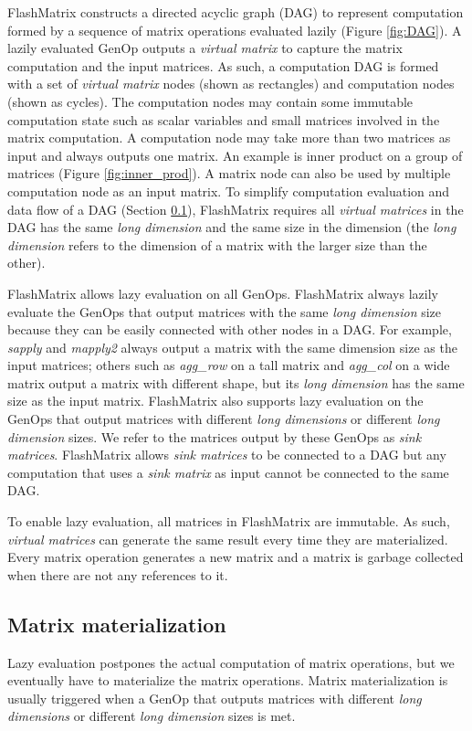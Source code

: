 FlashMatrix constructs a directed acyclic graph (DAG) \cite{} to represent
computation formed by a sequence of matrix operations evaluated lazily
(Figure \ref{fig:DAG}). A lazily evaluated GenOp outputs a \textit{virtual matrix}
to capture the matrix computation and the input matrices. As such, a computation
DAG is formed with a set of \textit{virtual matrix} nodes (shown as rectangles)
and computation nodes (shown as cycles).
The computation nodes may contain some immutable computation state such as
scalar variables and small matrices involved in the matrix computation.
A computation node may take more than two matrices as input and always outputs
one matrix. An example is inner product on a group of matrices (Figure
\ref{fig:inner_prod}). A matrix node can also be used by multiple computation
node as an input matrix.
To simplify computation evaluation and data flow of a DAG (Section
\ref{sec:materialize}), FlashMatrix requires all \textit{virtual matrices} in
the DAG has the same \textit{long dimension} and the same size in the dimension
(the \textit{long dimension} refers to the dimension of a matrix with the larger
size than the other).

FlashMatrix allows lazy evaluation on all GenOps.
FlashMatrix always lazily evaluate the GenOps that output matrices with
the same \textit{long dimension} size because they can be easily connected
with other nodes in a DAG. For example, \textit{sapply} and \textit{mapply2}
always output a matrix with the same dimension size as the input matrices;
others such
as \textit{agg\_row} on a tall matrix and \textit{agg\_col} on a wide matrix output
a matrix with different shape, but its \textit{long dimension} has the same size
as the input matrix. FlashMatrix also supports lazy evaluation on the GenOps
that output matrices with different \textit{long dimensions} or different
\textit{long dimension} sizes. We refer to the matrices output by these GenOps
as \textit{sink matrices}.
FlashMatrix allows \textit{sink matrices} to be connected to a DAG but any computation
that uses a \textit{sink matrix} as input cannot be connected to the same DAG.

To enable lazy evaluation, all matrices in FlashMatrix are immutable.
As such, \textit{virtual matrices} can generate the same result every time
they are materialized. Every matrix operation generates a new matrix
and a matrix is garbage collected when there are not any references to it.

\subsection{Matrix materialization} \label{sec:materialize}
Lazy evaluation postpones the actual computation of matrix operations, but we
eventually have to materialize the matrix operations. Matrix materialization
is usually triggered when a GenOp that outputs matrices with different
\textit{long dimensions} or different \textit{long dimension} sizes is met.

